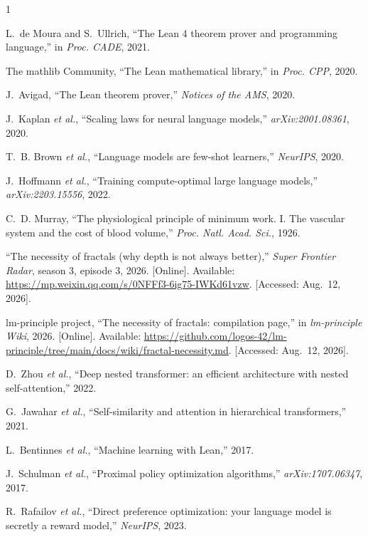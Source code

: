 \documentclass[journal]{IEEEtran}
\begin{document}
\begin{thebibliography}{1}

L.~de Moura and S.~Ullrich, ``The Lean 4 theorem prover and programming
language,'' in \emph{Proc. CADE}, 2021.

The mathlib Community, ``The Lean mathematical library,'' in \emph{Proc. CPP},
2020.

J.~Avigad, ``The Lean theorem prover,'' \emph{Notices of the AMS}, 2020.

J.~Kaplan \emph{et al.}, ``Scaling laws for neural language models,''
\emph{arXiv:2001.08361}, 2020.

T.~B. Brown \emph{et al.}, ``Language models are few-shot learners,''
\emph{NeurIPS}, 2020.

J.~Hoffmann \emph{et al.}, ``Training compute-optimal large language models,''
\emph{arXiv:2203.15556}, 2022.

C.~D. Murray, ``The physiological principle of minimum work. I. The vascular
system and the cost of blood volume,'' \emph{Proc. Natl. Acad. Sci.}, 1926.

``The necessity of fractals (why depth is not always better),'' \emph{Super
Frontier Radar}, season 3, episode 3, 2026. [Online]. Available:
\url{https://mp.weixin.qq.com/s/0NFFf3-6ig75-IWKd61vzw}. [Accessed: Aug.\ 12,
2026].

lm-principle project, ``The necessity of fractals: compilation page,'' in
\emph{lm-principle Wiki}, 2026. [Online]. Available:
\url{https://github.com/logos-42/lm-principle/tree/main/docs/wiki/fractal-necessity.md}.
[Accessed: Aug.\ 12, 2026].

D.~Zhou \emph{et al.}, ``Deep nested transformer: an efficient architecture
with nested self-attention,'' 2022.

G.~Jawahar \emph{et al.}, ``Self-similarity and attention in hierarchical
transformers,'' 2021.

L.~Bentinnes \emph{et al.}, ``Machine learning with Lean,'' 2017.

J.~Schulman \emph{et al.}, ``Proximal policy optimization algorithms,''
\emph{arXiv:1707.06347}, 2017.

R.~Rafailov \emph{et al.}, ``Direct preference optimization: your language
model is secretly a reward model,'' \emph{NeurIPS}, 2023.

\end{thebibliography}
\end{document}
